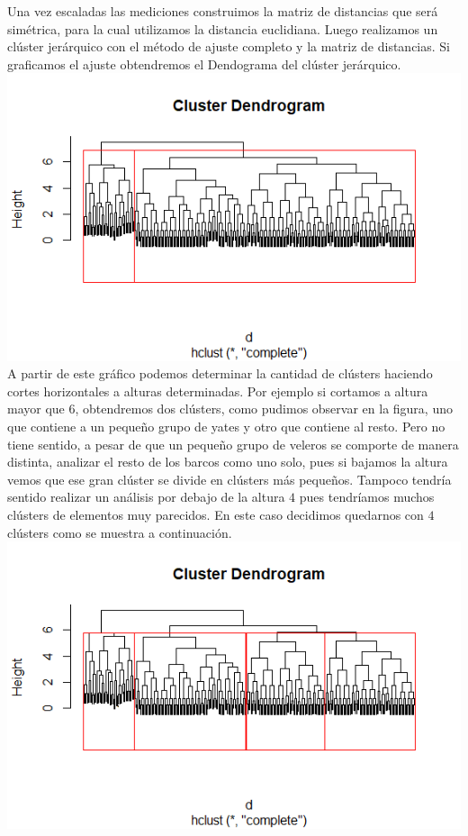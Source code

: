 \documentclass[twoside]{article}
\begin{document}
\begin{multicols}{2}
Una vez escaladas las mediciones construimos la matriz de distancias que ser\'a sim\'etrica, para la cual utilizamos la distancia euclidiana. Luego realizamos un cl\'uster jer\'arquico con el m\'etodo de ajuste completo y la matriz de distancias. Si graficamos el ajuste obtendremos el Dendograma del cl\'uster jer\'arquico.\\

\includegraphics[scale = 0.5]{images/pic_29.png} \\

A partir de este gr\'afico podemos determinar la cantidad de cl\'usters haciendo cortes horizontales a alturas determinadas. Por ejemplo si cortamos a altura mayor que $6$, obtendremos dos cl\'usters, como pudimos observar en la figura, uno que contiene a un peque\~no grupo de yates y otro que contiene al resto. Pero no tiene sentido, a pesar de que un peque\~no grupo de veleros se comporte de manera distinta, analizar el resto de los barcos como uno solo, pues si bajamos la altura vemos que ese gran cl\'uster se divide en cl\'usters m\'as peque\~nos. Tampoco tendr\'ia sentido realizar un an\'alisis por debajo de la altura $4$ pues tendr\'iamos muchos cl\'usters de elementos muy parecidos. En este caso decidimos quedarnos con $4$ cl\'usters como se muestra a continuaci\'on.\\

\includegraphics[scale = 0.5]{images/pic_30.png} \\


\end{multicols}
\end{document}
